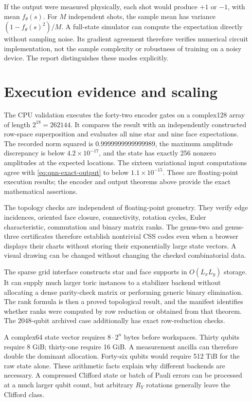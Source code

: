 If the output were measured physically, each shot would produce $+1$ or
$-1$, with mean $f_\theta(s)$.  For $M$ independent shots, the sample
mean has variance $(1-f_\theta(s)^2)/M$.  A full-state simulator can
compute the expectation directly without sampling noise.  Its gradient
agreement therefore verifies numerical circuit implementation, not the
sample complexity or robustness of training on a noisy device.  The
report distinguishes these modes explicitly.

\section{Execution evidence and scaling}

The CPU validation executes the forty-two encoder gates on a complex128
array of length $2^{18}=262144$.  It compares the result with an
independently constructed row-space superposition and evaluates all nine
star and nine face expectations.  The recorded norm squared is
$0.9999999999999989$, the maximum amplitude discrepancy is below
$4.2\times10^{-17}$, and the state has exactly 256 nonzero amplitudes
at the expected locations.  The sixteen variational input computations
agree with \eqref{eq:qnn-exact-output} to below $1.1\times10^{-15}$.
These are floating-point execution results; the encoder and output
theorems above provide the exact mathematical assertions.

The topology checks are independent of floating-point geometry.  They
verify edge incidences, oriented face closure, connectivity, rotation
cycles, Euler characteristic, commutation and binary matrix ranks.  The
genus-two and genus-three certificates therefore establish nontrivial
CSS codes even when a browser displays their charts without storing
their exponentially large state vectors.  A visual drawing can be
changed without changing the checked combinatorial data.

The sparse grid interface constructs star and face supports in
$O(L_xL_y)$ storage.  It can supply much larger toric instances to a
stabilizer backend without allocating a dense parity-check matrix or
performing generic binary elimination.  The rank formula is then a
proved topological result, and the manifest identifies whether ranks
were computed by row reduction or obtained from that theorem.  The
2048-qubit archived case additionally has exact row-reduction checks.

A complex64 state vector requires $8\cdot2^n$ bytes before workspaces.
Thirty qubits require 8 GiB; thirty-one require 16 GiB.  A measurement
ancilla can therefore double the dominant allocation.  Forty-six
qubits would require 512 TiB for the raw state alone.  These arithmetic
facts explain why different backends are necessary.  A compressed
Clifford state or batch of Pauli errors can be processed at a much
larger qubit count, but arbitrary $R_Y$ rotations generally leave the
Clifford class.


